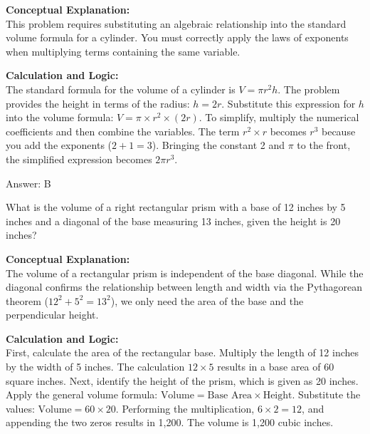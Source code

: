 \documentclass[11pt,paper=a4,answers]{exam}
\begin{document}
\begin{questions}
\begin{solution}
\textbf{Conceptual Explanation:} \\
This problem requires substituting an algebraic relationship into the standard volume formula for a cylinder. You must correctly apply the laws of exponents when multiplying terms containing the same variable.

\vspace{30pt}

\textbf{Calculation and Logic:} \\
The standard formula for the volume of a cylinder is $V = \pi r^2 h$. The problem provides the height in terms of the radius: $h = 2r$. Substitute this expression for $h$ into the volume formula: $V = \pi \times r^2 \times (2r)$. To simplify, multiply the numerical coefficients and then combine the variables. The term $r^2 \times r$ becomes $r^3$ because you add the exponents ($2+1=3$). Bringing the constant 2 and $\pi$ to the front, the simplified expression becomes $2\pi r^3$.

\vspace{30pt}

Answer: \colorbox{yellow!100}{B}
\end{solution}

\vspace{60pt}

\question
What is the volume of a right rectangular prism with a base of 12 inches by 5 inches and a diagonal of the base measuring 13 inches, given the height is 20 inches?

\begin{solution}
\textbf{Conceptual Explanation:} \\
The volume of a rectangular prism is independent of the base diagonal. While the diagonal confirms the relationship between length and width via the Pythagorean theorem ($12^2 + 5^2 = 13^2$), we only need the area of the base and the perpendicular height.

\vspace{30pt}

\textbf{Calculation and Logic:} \\
First, calculate the area of the rectangular base. Multiply the length of 12 inches by the width of 5 inches. The calculation $12 \times 5$ results in a base area of 60 square inches. Next, identify the height of the prism, which is given as 20 inches. Apply the general volume formula: $\text{Volume} = \text{Base Area} \times \text{Height}$. Substitute the values: $\text{Volume} = 60 \times 20$. Performing the multiplication, $6 \times 2 = 12$, and appending the two zeros results in 1,200. The volume is 1,200 cubic inches.


\end{solution}
\end{questions}
\end{document}
